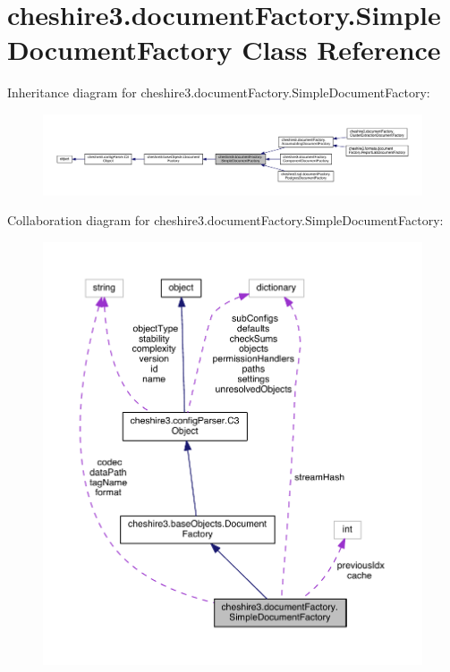 \hypertarget{classcheshire3_1_1document_factory_1_1_simple_document_factory}{\section{cheshire3.\-document\-Factory.\-Simple\-Document\-Factory Class Reference}
\label{classcheshire3_1_1document_factory_1_1_simple_document_factory}
}


Inheritance diagram for cheshire3.\-document\-Factory.\-Simple\-Document\-Factory\-:
\nopagebreak
\begin{figure}[H]
\begin{center}
\leavevmode
\includegraphics[width=350pt]{classcheshire3_1_1document_factory_1_1_simple_document_factory__inherit__graph}
\end{center}
\end{figure}


Collaboration diagram for cheshire3.\-document\-Factory.\-Simple\-Document\-Factory\-:
\nopagebreak
\begin{figure}[H]
\begin{center}
\leavevmode
\includegraphics[width=350pt]{classcheshire3_1_1document_factory_1_1_simple_document_factory__coll__graph}
\end{center}
\end{figure}
